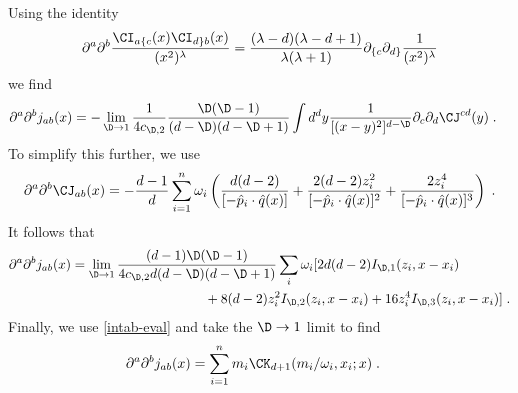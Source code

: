 \documentclass[11pt]{article}
\def\l{{\lambda}}
\def\o{{\omega}}
\def\p{{\partial}}
\begin{document}
Using the identity
\begin{equation}
\begin{split}
\p^a \p^b \frac{ \CI_{a\{c}(x) \CI_{d\}b} (x) }{ ( x^2 )^\l } = \frac{(\l-d )( \l - d + 1 )}{ \l ( \l + 1 ) }   \p_{\{c}  \p_{d\}} \frac{1}{ ( x^2 )^\l } 
\end{split}
\end{equation}
we find
\begin{equation}
\begin{split}\label{ddjgr}
\p^a \p^b j_{ab} (x) &=-  \lim_{\D \to 1} \frac{1}{4 c_{\D,2} } \frac{\D(\D-1)}{ (d-\D) ( d-\D + 1 ) }   \int d^d y   \frac{1}{[( x - y )^2]^{d-\D} } \p_c \p_d  \CJ^{cd} (y) \; . 
\end{split}
\end{equation}
To simplify this further, we use
\begin{equation}
\begin{split}
\p^a \p^b \CJ_{ab}(x) = - \frac{d-1}{d} \sum_{i=1}^n \o_i \left( \frac{d(d-2)}{[ - {\hat p}_i \cdot {\hat q}(x) ]} + \frac{2 ( d - 2 )z_i^2}{[ - {\hat p}_i \cdot {\hat q}(x) ]^2} + \frac{2z_i^4}{[ - {\hat p}_i \cdot {\hat q}(x) ] ^3} \right) \; . 
\end{split}
\end{equation}
It follows that
\begin{equation}
\begin{split}
\p^a \p^b j_{ab} (x) &=  \lim_{\D \to 1}  \frac{(d-1)\D(\D-1)}{ 4 c_{\D,2} d (d-\D) ( d-\D + 1 ) } \sum_i \o_i  [ 2 d ( d - 2 ) I_{\D,1} (z_i , x - x_i )  \\
& \qquad \qquad \qquad \qquad \qquad + 8 ( d - 2 ) z_i^2 I_{\D,2} (z_i , x - x_i ) + 16 z_i^4  I_{\D,3} (z_i , x - x_i )  ] \; .
\end{split}
\end{equation}
Finally, we use \eqref{intab-eval} and take the $\D \to 1$ limit to find
\begin{equation}
\begin{split}
\p^a \p^b j_{ab} (x) &=  \sum_{i=1}^n m_i \CK_{d+1} ( m_i / \o_i , x_i ; x ) \; . 
\end{split}
\end{equation}










\end{document}
